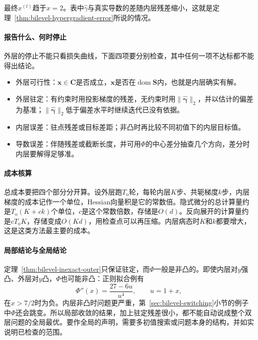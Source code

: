 最终$x^{(t)}$趋于$x=2$。表中$\hat{\gamma}$与真实导数的差随内层残差缩小，这就是定理~\ref{thm:bilevel-hypergradient-error}所说的情况。

\paragraph{报告什么、何时停止}
外层的停止不能只看损失曲线，下面四项要分别检查，其中任何一项不达标都不能得出结论。

\begin{itemize}
 \item 外层可行性：$\bm{x}\in\bm{C}$是否成立，$\bm{x}$是否在$\operatorname{dom}\bm{S}$内，也就是内层确实有解。
 \item 外层驻定：有约束时用投影梯度的残差，无约束时用$\lVert\hat{\bm{\gamma}}\rVert_2$，并以估计的偏差为基准；$\lVert\hat{\bm{\gamma}}\rVert_2$低于偏差水平时继续迭代已没有依据。
 \item 内层误差：驻点残差或目标差距；非凸时再比较不同初值下的内层目标值。
 \item 导数误差：伴随残差或截断长度，并可用$\Phi$的中心差分抽查几个方向，差分时内层要解得足够准。
\end{itemize}

\paragraph{成本核算}
总成本要把四个部分分开算。设外层跑$T_{\mathrm{o}}$轮，每轮内层$K$步、共轭梯度$k$步，内层梯度的成本记作一个单位，Hessian向量积是它的常数倍。隐式微分的总计算量约是$T_{\mathrm{o}}(K+ck)$个单位，$c$是这个常数倍数，存储是$O(d)$。反向展开的计算量约是$cT_{\mathrm{o}}K$，存储变成$O(Kd)$，用检查点可以再压缩。内层病态时$K$和$k$都要增大，这是这类方法最主要的成本。

\paragraph{局部结论与全局结论}
定理~\ref{thm:bilevel-inexact-outer}只保证驻定，而$\Phi$一般是非凸的。即使内层对$y$强凸、外层对$y$凸，$\Phi$也可能非凸：正则拟合例有
\[
 \Phi''(x)=\frac{27-6u}{u^4},\qquad u=1+x,
\]
在$x>7/2$时为负。内层非凸时问题更严重，第~\ref{sec:bilevel-switching}小节的例子中$\Phi$还会跳变。所以局部收敛的结果，加上驻定残差很小，都不能自动说成整个双层问题的全局最优。要作全局的声明，需要多初值搜索或问题本身的结构，并如实说明已检查的范围。
